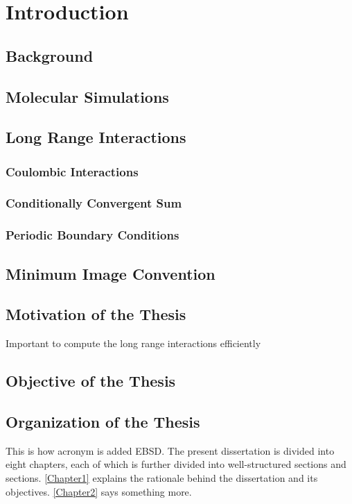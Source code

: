 \chapter{Introduction} %

\label{Chapter1}



\section{Background}
\section{Molecular Simulations}
\section{Long Range Interactions}
\subsection{Coulombic Interactions}
\subsection{Conditionally Convergent Sum}
\subsection{Periodic Boundary Conditions}
\section{Minimum Image Convention}
\section{Motivation of the Thesis} %
Important to compute the long range interactions efficiently
\section{Objective of the Thesis} %
\section{Organization of the Thesis}

This is how acronym is added \ac{EBSD}. The present dissertation is divided into eight chapters, each of which is further divided into well-structured sections and sections. \autoref{Chapter1} explains the rationale behind the dissertation and its objectives. \autoref{Chapter2} says something more. 